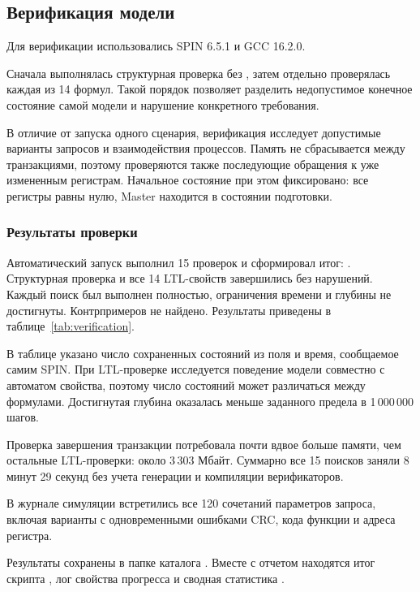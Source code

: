\subsection{Верификация модели}

Для верификации использовались SPIN 6.5.1 и GCC 16.2.0.

Сначала выполнялась структурная проверка без ,
затем отдельно проверялась каждая из 14 формул. Такой порядок
позволяет разделить недопустимое конечное состояние самой модели
и нарушение конкретного требования.

В отличие от запуска одного сценария, верификация исследует допустимые
варианты запросов и взаимодействия процессов. Память не сбрасывается
между транзакциями, поэтому проверяются также последующие обращения
к уже измененным регистрам. Начальное состояние при этом фиксировано:
все регистры равны нулю, Master находится в состоянии подготовки.

\subsubsection{Результаты проверки}

Автоматический запуск выполнил 15 проверок и сформировал итог:
. Структурная проверка и все 14 LTL-свойств
завершились без нарушений. Каждый поиск был выполнен полностью,
ограничения времени и глубины не достигнуты. Контрпримеров не найдено.
Результаты приведены в таблице~\ref{tab:verification}.



В таблице указано число сохраненных состояний из поля 
и время, сообщаемое самим SPIN. При LTL-проверке исследуется поведение
модели совместно с автоматом свойства, поэтому число состояний может
различаться между формулами. Достигнутая глубина оказалась меньше
заданного предела в 1\,000\,000 шагов.

Проверка завершения транзакции потребовала почти вдвое больше памяти,
чем остальные LTL-проверки: около 3\,303 Мбайт. Суммарно все 15 поисков
заняли 8 минут 29 секунд без учета генерации и компиляции верификаторов.

В журнале симуляции встретились все 120 сочетаний параметров запроса,
включая варианты с одновременными ошибками CRC, кода функции
и адреса регистра.

Результаты сохранены в папке  каталога
. Вместе с отчетом находятся итог скрипта
, лог свойства прогресса
 и сводная статистика
.

